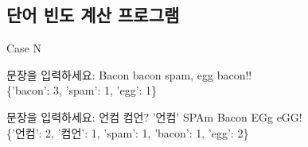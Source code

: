 \documentclass[a4paper,11pt]{scrartcl}
\begin{document}
\subsection{단어 빈도 계산 프로그램}

\begin{labeling}{Case N}
  \item[Case 1]
  {\ttfamily
    문장을 입력하세요: Bacon bacon spam, egg bacon!! \\
    \{'bacon': 3, 'spam': 1, 'egg': 1\}
  }

  \item[Case 2]
  {\ttfamily
    문장을 입력하세요: 언컴 컴언? '언컴' SPAm Bacon EGg eGG! \\
    \{'언컴': 2, '컴언': 1, 'spam': 1, 'bacon': 1, 'egg': 2\}
  }

\end{labeling}
\end{document}
